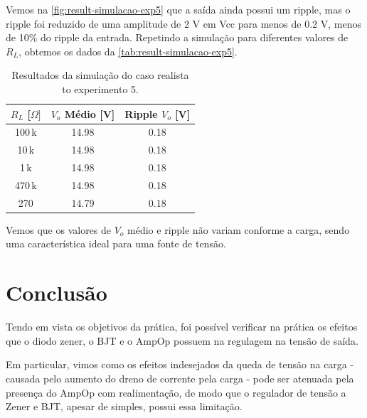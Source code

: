 \documentclass[
	12pt,				%
	oneside,			%
	a4paper,			%
	chapter=TITLE,
	sumario=tradicional,
	english,			%
	brazil				%
]{abntex2}
\begin{document}
Vemos na \autoref{fig:result-simulacao-exp5} que a saída ainda possui um ripple, mas 
o ripple foi reduzido de uma amplitude de 2 V em Vcc para menos de 0.2 V,
menos de 10\% do ripple da entrada. Repetindo a simulação para diferentes 
valores de $R_L$, obtemos os dados da \autoref{tab:result-simulacao-exp5}.

\begin{table}[htb]
	\caption{Resultados da simulação do caso realista to experimento 5.}
	\centering
	\begin{tabular}{c|c|c}
		\hline
		\textbf{$R_L$ [$\Omega]$} & \textbf{$V_o$ Médio [V]} & \textbf{Ripple $V_o$ [V]}  \\
		\hline
		100\,k & 14.98 & 0.18 \\
		10\,k & 14.98 & 0.18 \\
		1\,k   & 14.98 & 0.18  \\
		470\,k   & 14.98 & 0.18  \\
		270    & 14.79 & 0.18 \\
		\hline
	\end{tabular}
	\label{tab:result-simulacao-exp5}
\end{table}

Vemos que os valores de $V_o$ médio e ripple não variam conforme a carga,
sendo uma característica ideal para uma fonte de tensão.

\chapter{Conclusão}\label{cap:conclusao} 

Tendo em vista os objetivos da prática, foi possível verificar na prática os efeitos que o diodo zener, o BJT e 
o AmpOp possuem na regulagem na tensão de saída. 

Em particular, vimos como os efeitos indesejados da queda de tensão na carga - causada pelo aumento do dreno de corrente 
pela carga - pode ser atenuada pela presença do AmpOp com realimentação, de modo que o regulador de tensão a Zener e BJT,
apesar de simples, possui essa limitação.
\end{document}
